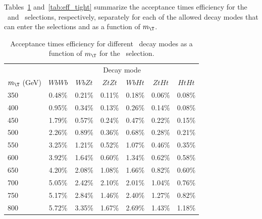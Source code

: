 Tables~\ref{tab:eff_loose} and~\ref{tab:eff_tight} 
summarize the acceptance times efficiency for the \loose\ and \tight\ selections, 
respectively,
separately for each of the allowed \TTbar decay modes that can enter
the selections and as a function of $m_{\T}$.

\begin{table}[htb]
\begin{center}
\begin{tabular}{l c c c c c c}
\toprule
 & \multicolumn{6}{c}{Decay mode} \\
$m_{\T}$ (GeV) & $WbWb$ & $WbZt$ & $ZtZt$ & $WbHt$ & $ZtHt$ & $HtHt$ \\
\midrule
350 & 0.48\% & 0.21\% & 0.11\% & 0.18\% & 0.06\% & 0.08\% \\
400 & 0.95\% & 0.34\% & 0.13\% & 0.26\% & 0.14\% & 0.08\% \\
450 & 1.79\% & 0.57\% & 0.24\% & 0.47\% & 0.22\% & 0.15\% \\
500 & 2.26\% & 0.89\% & 0.36\% & 0.68\% & 0.28\% & 0.21\% \\
550 & 3.25\% & 1.21\% & 0.52\% & 1.07\% & 0.46\% & 0.35\% \\
600 & 3.92\% & 1.64\% & 0.60\% & 1.34\% & 0.62\% & 0.58\% \\
650 & 4.20\% & 2.08\% & 1.08\% & 1.66\% & 0.82\% & 0.60\% \\
700 & 5.05\% & 2.42\% & 2.10\% & 2.01\% & 1.04\% & 0.76\% \\
750 & 5.17\% & 2.84\% & 1.46\% & 2.40\% & 1.27\% & 0.82\% \\
800 & 5.72\% & 3.35\% & 1.67\% & 2.69\% & 1.43\% & 1.18\% \\
\bottomrule
\end{tabular}
\caption{Acceptance times efficiency for different \TTbar\ decay modes as a function of $m_{\T}$ for the \loose\ selection.}
\label{tab:eff_loose}
\end{center}
\end{table}

